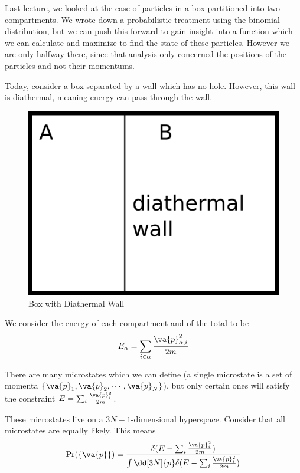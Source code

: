 \documentclass[a4paper,twoside,master.tex]{subfiles}
\begin{document}
Last lecture, we looked at the case of particles in a box partitioned into two compartments. We wrote down a probabilistic treatment using the binomial distribution, but we can push this forward to gain insight into a function which we can calculate and maximize to find the state of these particles. However we are only halfway there, since that analysis only concerned the positions of the particles and not their momentums.

Today, consider a box separated by a wall which has no hole. However, this wall is diathermal, meaning energy can pass through the wall.


\begin{figure}[h]
    \centering
    \includegraphics{figures/lec_05_diathermal_box.png}
    \caption{Box with Diathermal Wall}
    \label{fig:box_with_diathermal_wall}
\end{figure}

We consider the energy of each compartment and of the total to be
\begin{equation}
    E_{\alpha} = \sum_{i \in \alpha} \frac{\va{p}^2_{\alpha,i}}{2m}
\end{equation}

There are many microstates which we can define (a single microstate is a set of momenta $ \{\va{p}_1,\va{ p}_2, \cdots,\va{ p}_N\} $), but only certain ones will satisfy the constraint $ E = \sum_i \frac{\va{p}^2_i}{2m} $.

These microstates live on a $ 3N-1 $-dimensional hyperspace. Consider that all microstates are equally likely. This means
\begin{equation}
    \Pr(\{\va{p}\}) = \frac{\delta(E - \sum_i \frac{\va{p}^2_i}{2m})}{\int \dd[3N]{p} \delta(E - \sum_i \frac{\va{p}_i^2}{2m})}
\end{equation}
\end{document}
